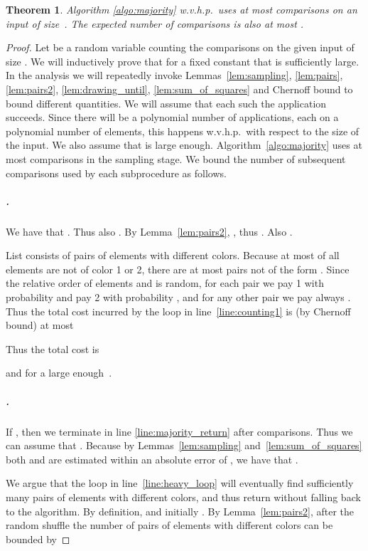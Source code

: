 \documentclass{article}[11pt,a4paper]
\newtheorem{theorem}[definition]{Theorem}
\begin{document}
\begin{theorem}
\label{lem:upperbound}
Algorithm \ref{algo:majority} w.v.h.p.\ uses at most  comparisons on
an input of size~. The expected number of comparisons is also at most .
\end{theorem}

\begin{proof}
Let  be a random variable counting the comparisons on the given input of size .
We will inductively prove that  for a fixed constant  that is sufficiently large.
In the analysis we will repeatedly invoke Lemmas~\ref{lem:sampling}, \ref{lem:pairs}, \ref{lem:pairs2}, \ref{lem:drawing_until}, \ref{lem:sum_of_squares} and Chernoff bound to bound different quantities.
We will assume that each such the application succeeds.
Since there will be a polynomial number of applications, each on a polynomial number of elements,
this happens w.v.h.p.\ with respect to the size of the input.
We also assume that  is large enough.
Algorithm~\ref{algo:majority} uses at most  comparisons
in the sampling stage. We bound the number of subsequent comparisons used by each
subprocedure as follows.

\subparagraph*{{\normalfont }.}
We have that . Thus also . By Lemma~\ref{lem:pairs2}, , thus . Also .

List  consists of pairs of elements with different colors. Because at most  of
all elements are not of color 1 or 2, there are at most  pairs not
of the form . Since the relative order of elements  and  is random,
for each pair  we pay 1 with probability  and pay 2 with probability , and for
any other pair we pay always . Thus the total cost incurred by the loop in line~\ref{line:counting1} is
(by Chernoff bound) at most

Thus the total cost is

and  for a large enough~.

\subparagraph*{{\normalfont }.}
If , then we terminate in line \ref{line:majority_return} after  comparisons.
Thus we can assume that .
Because by Lemmas~\ref{lem:sampling} and~\ref{lem:sum_of_squares} both
 and  are estimated within an absolute error of ,
we have that .

We argue that the loop in line~\ref{line:heavy_loop} will eventually find sufficiently many
pairs of elements with different colors, and thus return without falling back to the  algorithm.
By definition,  and initially . By Lemma~\ref{lem:pairs2},
after the random shuffle the number  of pairs of elements  with different colors
can be bounded by


\end{proof}
\end{document}
